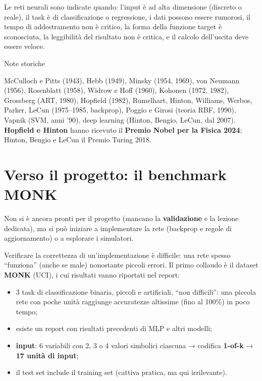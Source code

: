 Le reti neurali sono indicate quando: l'input è ad alta dimensione
(discreto o reale), il task è di classificazione o regressione, i dati
possono essere rumorosi, il tempo di addestramento non è critico, la
forma della funzione target è sconosciuta, la leggibilità del risultato
non è critica, e il calcolo dell'uscita deve essere veloce.

\begin{boxnote}{Note storiche}

McCulloch e Pitts (1943), Hebb (1949), Minsky (1954, 1969), von Neumann
(1956), Rosenblatt (1958), Widrow e Hoff (1960), Kohonen (1972, 1982),
Grossberg (ART, 1980), Hopfield (1982), Rumelhart, Hinton, Williams,
Werbos, Parker, LeCun (1975--1985, backprop), Poggio e Girosi (teoria
RBF, 1990), Vapnik (SVM, anni '90), deep learning (Hinton, Bengio,
LeCun, dal 2007). \textbf{Hopfield e Hinton} hanno ricevuto il
\textbf{Premio Nobel per la Fisica 2024}; Hinton, Bengio e LeCun il
Premio Turing 2018.

\end{boxnote}

\section{Verso il progetto: il benchmark
MONK}\label{verso-il-progetto-il-benchmark-monk}

Non si è ancora pronti per il progetto (mancano la \textbf{validazione}
e la lezione dedicata), ma si può iniziare a implementare la rete
(backprop e regole di aggiornamento) o a esplorare i simulatori.

Verificare la correttezza di un'implementazione è difficile: una rete
spesso ``funziona'' (anche se male) nonostante piccoli errori. Il primo
collaudo è il dataset \textbf{MONK} (UCI), i cui risultati vanno
riportati nel report:

\begin{itemize}
\tightlist
\item
  3 task di classificazione binaria, piccoli e artificiali, ``non
  difficili'': una piccola rete con poche unità raggiunge accuratezze
  altissime (fino al 100\%) in poco tempo;
\item
  esiste un report con risultati precedenti di MLP e altri modelli;
\item
  \textbf{input}: 6 variabili con 2, 3 o 4 valori simbolici ciascuna →
  codifica \textbf{1-of-k} → \textbf{17 unità di input};
\item
  il test set include il training set (cattiva pratica, ma qui
  irrilevante).
\end{itemize}

